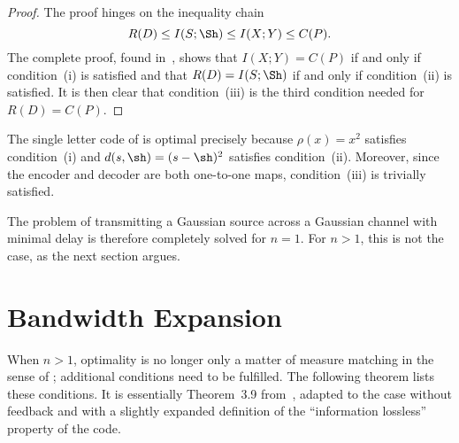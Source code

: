 \begin{proof}
  The proof hinges on the inequality chain
  \begin{equation*}
    R(D) \le I(S;\Sh) \le I(X;Y) \le C(P).
  \end{equation*}
  The complete proof, found in~\cite{GastparRV2003}, shows that $I(X;Y) = C(P)$
  if and only if condition~(i) is satisfied and that $R(D) = I(S;\Sh)$ if and
  only if condition~(ii) is satisfied. It is then clear that condition~(iii) is
  the third condition needed for $R(D) = C(P)$.
\end{proof}

The single letter code of  is optimal precisely because
$\rho(x) = x^2$ satisfies condition~(i) and $d(s,\sh) = (s - \sh)^2$ satisfies
condition~(ii). Moreover, since the encoder and decoder are both one-to-one
maps, condition~(iii) is trivially satisfied.

The problem of transmitting a Gaussian source across a Gaussian channel with
minimal delay is therefore completely solved for $n = 1$. For $n > 1$, this is
not the case, as the next section argues.


\section{Bandwidth Expansion}

When $n > 1$, optimality is no longer only a matter of measure matching in the
sense of ; additional conditions need to be fulfilled. The
following theorem lists these conditions. It is essentially Theorem~3.9
from~\cite{GastparThesis}, adapted to the case without feedback and with a
slightly expanded definition of the ``information lossless'' property of the
code. 

